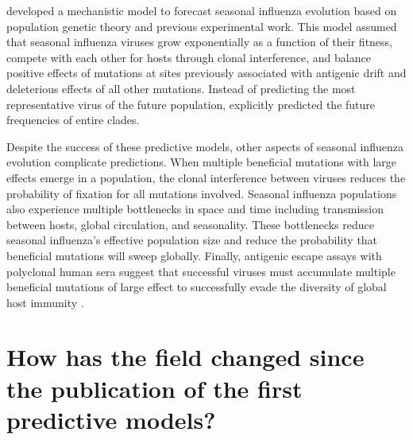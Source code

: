\citet{Luksza:2014hj} developed a mechanistic model to forecast seasonal influenza evolution based on population genetic theory and previous experimental work.
This model assumed that seasonal influenza viruses grow exponentially as a function of their fitness, compete with each other for hosts through clonal interference, and balance positive effects of mutations at sites previously associated with antigenic drift and deleterious effects of all other mutations.
Instead of predicting the most representative virus of the future population, \citet{Luksza:2014hj} explicitly predicted the future frequencies of entire clades.

Despite the success of these predictive models, other aspects of seasonal influenza evolution complicate predictions.
When multiple beneficial mutations with large effects emerge in a population, the clonal interference between viruses reduces the probability of fixation for all mutations involved.
Seasonal influenza populations also experience multiple bottlenecks in space and time including transmission between hosts, global circulation, and seasonality.
These bottlenecks reduce seasonal influenza's effective population size and reduce the probability that beneficial mutations will sweep globally.
Finally, antigenic escape assays with polyclonal human sera suggest that successful viruses must accumulate multiple beneficial mutations of large effect to successfully evade the diversity of global host immunity \citep{Lee2019}.

\section{How has the field changed since the publication of the first predictive models?}


